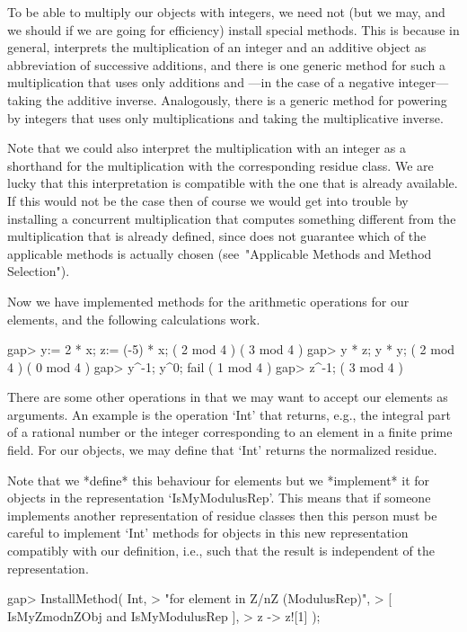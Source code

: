 To be able to multiply our objects with integers,
we need not (but we may, and we should if we are going for efficiency)
install special methods.
This is because in general, {\GAP} interprets the multiplication
of an integer and an additive object as abbreviation of successive
additions, and there is one generic method for such a multiplication
that uses only additions and ---in the case of a negative integer---
taking the additive inverse.
Analogously, there is a generic method for powering by integers
that uses only multiplications and taking the multiplicative inverse.

Note that we could also interpret the multiplication with an integer
as a shorthand for the multiplication with the corresponding residue
class.
We are lucky that this interpretation is compatible with the one that
is already available.
If this would not be the case then of course we would get into trouble
by installing a concurrent multiplication that computes something
different from the multiplication that is already defined,
since {\GAP} does not guarantee which of the applicable methods is
actually chosen (see~"Applicable Methods and Method Selection").

Now we have implemented methods for the arithmetic operations for our
elements, and the following calculations work.

\beginexample
gap> y:= 2 * x;  z:= (-5) * x;
( 2 mod 4 )
( 3 mod 4 )
gap> y * z;  y * y;
( 2 mod 4 )
( 0 mod 4 )
gap> y^-1;  y^0;
fail
( 1 mod 4 )
gap> z^-1;
( 3 mod 4 )
\endexample

There are some other operations in {\GAP} that we may want to accept
our elements as arguments.
An example is the operation `Int' that returns, e.g.,
the integral part of a rational number or the integer corresponding to
an element in a finite prime field.
For our objects, we may define that `Int' returns the normalized residue.

Note that we *define* this behaviour for elements
but we *implement* it for objects in the representation `IsMyModulusRep'.
This means that if someone implements another representation of
residue classes then this person must be careful to implement `Int'
methods for objects in this new representation compatibly with our
definition, i.e., such that the result is independent of the representation.

\beginexample
gap> InstallMethod( Int,
>    "for element in Z/nZ (ModulusRep)",
>    [ IsMyZmodnZObj and IsMyModulusRep ],
>    z -> z![1] );
\endexample

